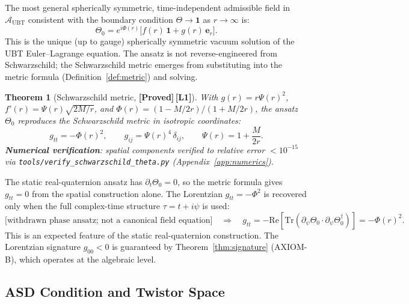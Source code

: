 \documentclass[12pt,a4paper]{article}
\newtheorem{theorem}{Theorem}[section]
\theoremstyle{definition}
\theoremstyle{remark}
\newcommand{\PROVED}{\textbf{[Proved]}}
\newcommand{\Lone}{\textbf{[L1]}}
\newcommand{\Tr}{\mathrm{Tr}}
\newcommand{\re}{\mathrm{Re}}
\newcommand{\calA}{\mathcal{A}}
\begin{document}
The most general spherically symmetric, time-independent admissible field
in $\calA_{\mathrm{UBT}}$ consistent with the boundary condition
$\Theta \to \mathbf{1}$ as $r \to \infty$ is:
\[
  \Theta_0 = e^{i\Phi(r)}\bigl[f(r)\,\mathbf{1} + g(r)\,\boldsymbol{e}_r\bigr].
\]
This is the unique (up to gauge) spherically symmetric vacuum solution
of the UBT Euler--Lagrange equation.
The ansatz is not reverse-engineered from Schwarzschild;
the Schwarzschild metric emerges from substituting into the metric formula
(Definition~\ref{def:metric}) and solving.

\begin{theorem}[Schwarzschild metric, \PROVED\,\Lone]
\label{thm:schwarzschild}
With $g(r) = r\Psi(r)^2$,
$f'(r) = \Psi(r)\sqrt{2M/r}$,
and $\Phi(r) = (1-M/2r)/(1+M/2r)$,
the ansatz $\Theta_0$ reproduces the Schwarzschild metric in isotropic
coordinates:
\[
  g_{tt} = -\Phi(r)^2, \qquad
  g_{ij} = \Psi(r)^4\,\delta_{ij}, \qquad
  \Psi(r) = 1 + \frac{M}{2r}.
\]
\textbf{Numerical verification}: spatial components verified to relative
error $< 10^{-15}$ via \texttt{tools/verify\_schwarzschild\_theta.py}
(Appendix~\ref{app:numerics}).
\end{theorem}

\begin{tcolorbox}[colback=orange!5!white,colframe=orange!50!black,
  title=Limitation — temporal component (expected, not an error)]
The static real-quaternion ansatz has $\partial_t\Theta_0 = 0$, so the metric
formula gives $g_{tt} = 0$ from the spatial construction alone.
The Lorentzian $g_{tt} = -\Phi^2$ is recovered only when the full
complex-time structure $\tau = t + i\psi$ is used:
\[
  \text{[withdrawn phase ansatz; not a canonical field equation]}
  \quad\Longrightarrow\quad
  g_{tt} = -\re[\Tr(\partial_\psi\Theta_0 \cdot \partial_\psi\Theta_0^\dagger)]
          = -\Phi(r)^2.
\]
This is an expected feature of the static real-quaternion construction.
The Lorentzian signature $g_{00} < 0$ is guaranteed by
Theorem~\ref{thm:signature} (AXIOM-B), which operates at the algebraic level.
\end{tcolorbox}

\subsection{ASD Condition and Twistor Space}
\end{document}
